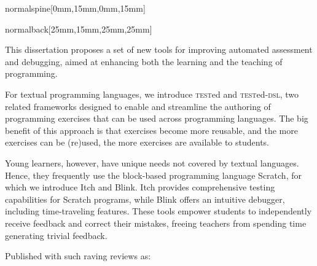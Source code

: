 \documentclass[coverheight=240mm,coverwidth=170mm,spinewidth=15mm]{bookcover}
\newenvironment{shadequote}[1]%
{%
     \def\quoteauthor{#1}%
     \tikz[remember picture,overlay,xshift=-22pt]
     \node (OQ) {\fontsize{50pt}{50pt}\selectfont``};%
     \noindent%
}{%
    \par\hfill\textit{\fontsize{12pt}{15pt}\selectfont\quoteauthor}%
}
\begin{document}
\begin{bookcover}
    \begin{bookcoverelement}{normal}{spine}[0mm,15mm,0mm,15mm]%
        \centering
        \hspace*{0.1cm}
         \par
        \vspace*{\fill}
    \end{bookcoverelement}
    \begin{bookcoverelement}{normal}{back}[25mm,15mm,25mm,25mm]
        \fontsize{11pt}{15pt}\selectfont{}\setlength{\parskip}{3mm}

        This dissertation proposes a set of new tools for improving automated assessment and debugging, aimed at enhancing both the learning and the teaching of programming.

        For textual programming languages, we introduce \textsc{test}ed and \textsc{test}ed-\textsc{dsl}, two related frameworks designed to enable and streamline the authoring of programming exercises that can be used across programming languages.
        The big benefit of this approach is that exercises become more reusable, and the more exercises can be (re)used, the more exercises are available to students.

        Young learners, however, have unique needs not covered by textual languages.
        Hence, they frequently use the block-based programming language Scratch, for which we introduce Itch and Blink.
        Itch provides comprehensive testing capabilities for Scratch programs, while Blink offers an intuitive debugger, including time-traveling features.
        These tools empower students to independently receive feedback and correct their mistakes, freeing teachers from spending time generating trivial feedback.

        \vspace*{\fill}%

        Published with such raving reviews as:
        \vspace*{0.5cm}%

%


\end{bookcoverelement}
\end{bookcover}
\end{document}
